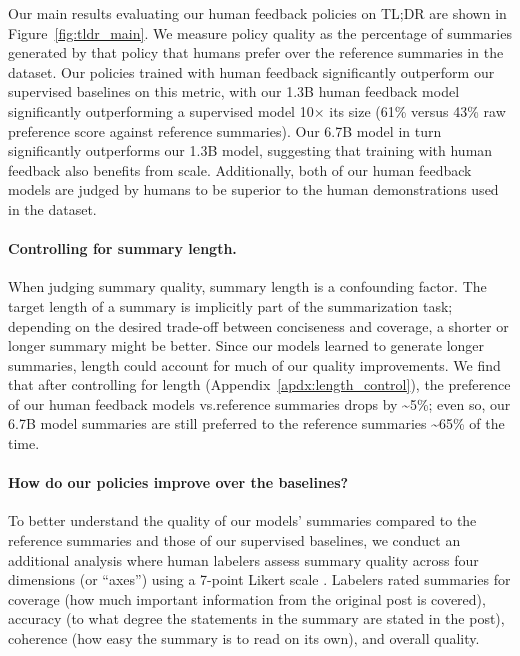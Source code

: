 Our main results evaluating our human feedback policies on TL;DR are shown in Figure~\ref{fig:tldr_main}. We measure policy quality as the percentage of summaries generated by that policy that humans prefer over the reference summaries in the dataset. Our policies trained with human feedback significantly outperform our supervised baselines on this metric, with our 1.3B human feedback model significantly outperforming a supervised model 10$\times$ its size (61\% versus 43\% raw preference score against reference summaries). Our 6.7B model in turn significantly outperforms our 1.3B model, suggesting that training with human feedback also benefits from scale. Additionally, both of our human feedback models are judged by humans to be superior to the human demonstrations used in the dataset.

\paragraph{Controlling for summary length.} When judging summary quality, summary length is a confounding factor. The target length of a summary is implicitly part of the summarization task; depending on the desired trade-off between conciseness and coverage, a shorter or longer summary might be better. Since our models learned to generate longer summaries, length could account for much of our quality improvements. We find that after controlling for length (Appendix~\ref{apdx:length_control}), the preference of our human feedback models vs.\@ reference summaries drops by \textasciitilde5\%; even so, our 6.7B model summaries are still preferred to the reference summaries \textasciitilde65\% of the time.

\paragraph{How do our policies improve over the baselines?}
\label{paragraph:axis_evals}

To better understand the quality of our models’ summaries compared to the reference summaries and those of our supervised baselines, we conduct an additional analysis where human labelers assess summary quality across four dimensions (or ``axes'') using a 7-point Likert scale \cite{likert1932technique}. Labelers rated summaries for coverage (how much important information from the original post is covered), accuracy (to what degree the statements in the summary are stated in the post), coherence (how easy the summary is to read on its own), and overall quality. 

